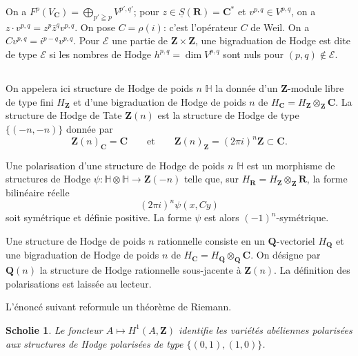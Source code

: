 \documentclass[11pt]{amsart}
\theoremstyle{plain}
\newtheorem{scholie}[theoreme]{Scholie}
\theoremstyle{definition}
\theoremstyle{remark}
\begin{document}
On a $F^p(V_\mathbf{C})=\bigoplus_{p'\geqq p}V^{p',q'}$; pour $z\in\underline{S}(\mathbf{R})=\mathbf{C}^*$ et $v^{p,q}\in V^{p,q}$, on a $z\cdot v^{p,q}=z^p\bar{z}^qv^{p,q}$. On pose $C=\rho(i)$: c'est l'op\'erateur $C$ de Weil. On a $C v^{p,q}=i^{p-q}v^{p,q}$. Pour $\mathscr{E}$ une partie de $\mathbf{Z}\times\mathbf{Z}$, une bigraduation de Hodge est dite de type $\mathscr{E}$ si les nombres de Hodge $h^{p,q}=\dim V^{p,q}$ sont nuls pour $(p,q)\notin\mathscr{E}$.

\subsection*{}
On appelera ici structure de Hodge de poids $n$ $\mathbb{H}$ la donn\'ee d'un $\mathbf{Z}$-module libre de type fini $H_\mathbf{Z}$ et d'une bigraduation de Hodge de poids $n$ de $H_\mathbf{C}=H_\mathbf{Z}\otimes_\mathbf{Z}\mathbf{C}$. La structure de Hodge de Tate $\mathbf{Z}(n)$ est la structure de Hodge de type $\{(-n,-n)\}$ donn\'ee par
\begin{equation*}
\mathbf{Z}(n)_\mathbf{C}=\mathbf{C}\qquad\text{et}\qquad \mathbf{Z}(n)_\mathbf{Z}=(2\pi i)^n\mathbf{Z}\subset\mathbf{C}.
\end{equation*}

Une polarisation d'une structure de Hodge de poids $n$ $\mathbb{H}$ est un morphisme de structures de Hodge $\psi\colon\mathbb{H}\otimes\mathbb{H}\to\mathbf{Z}(-n)$ telle que, sur $H_\mathbf{R}=H_\mathbf{Z}\otimes_\mathbf{Z}\mathbf{R}$, la forme bilin\'eaire r\'eelle
\begin{equation*}
(2\pi i)^n\psi(x,Cy)
\end{equation*}
soit sym\'etrique et d\'efinie positive. La forme $\psi$ est alors $(-1)^n$-sym\'etrique.

Une structure de Hodge de poids $n$ rationnelle consiste en un $\mathbf{Q}$-vectoriel $H_\mathbf{Q}$ et une bigraduation de Hodge de poids $n$ de $H_\mathbf{C}=H_\mathbf{Q}\otimes_\mathbf{Q}\mathbf{C}$. On d\'esigne par $\mathbf{Q}(n)$ la structure de Hodge rationnelle sous-jacente \`a $\mathbf{Z}(n)$. La d\'efinition des polarisations est laiss\'ee au lecteur.

L'\'enonc\'e suivant reformule un th\'eor\`eme de Riemann.

\begin{scholie}
Le foncteur $A\mapsto H^1(A,\mathbf{Z})$ identifie les vari\'et\'es ab\'eliennes polaris\'ees aux structures de Hodge polaris\'ees de type $\{(0,1),(1,0)\}$.
\end{scholie}
\end{document}
